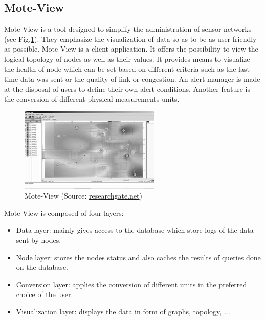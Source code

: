 \subsection{Mote-View}

Mote-View \cite{turon2005mote} is a tool designed to simplify the administration of sensor networks (see Fig.\ref{fig:moteview}). They emphasize the visualization of data so as to be as user-friendly as possible. Mote-View is a client application. It offers the possibility to view the logical topology of nodes as well as their values. It provides  means to visualize the health of node which can be set based on different criteria such as the last time data was sent or the quality of link or congestion. An alert manager is made at the disposal of users to define their own alert conditions. Another feature is the conversion of different physical measurements units. \\

\begin{figure}
  \centering
  \includegraphics[width=0.6\textwidth]{res/moteview.png}
  \caption{Mote-View (Source: \href{www.researchgate.net/publication/4157258_MOTE-VIEW_A_sensor_network_monitoring_and_management_tool}{researchgate.net})}
  \label{fig:moteview}
\end{figure}

Mote-View is composed of four layers:
\begin{itemize}
  \item Data layer: mainly gives access to the database which store logs of the data sent by nodes.
  \item Node layer: stores the nodes status and also caches the results of queries done on the database.
  \item Conversion layer: applies the conversion of different units in the preferred choice of the user.
  \item Visualization layer: displays the data in form of graphs, topology, ...
\end{itemize}

